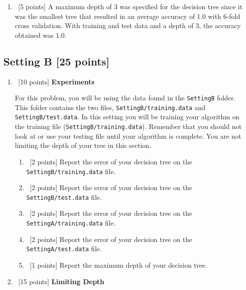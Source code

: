 \begin{enumerate}
\begin{enumerate}
  \item ~[5 points]  A maximum depth of 3 was specified for the decision tree since it was the smallest tree that resulted in an average accuracy of 1.0 with 6-fold cross validation. With training and test data and a depth of 3, the accuracy obtained was 1.0.
  \end{enumerate}

\end{enumerate}

\subsection*{Setting B [25 points]}

\begin{enumerate}
\item ~[10 points] \textbf{Experiments}
  
  For this problem, you will be using the data found in the \texttt{SettingB} folder. This folder contains the two files, \texttt{SettingB/training.data} and \texttt{SettingB/test.data}. In this setting you will be training your algorithm on the training file (\texttt{SettingB/training.data}). Remember that you should not look at or use your testing file until your algorithm is complete. You are not limiting the depth of your tree in this section. 
  
  \begin{enumerate}
    
  \item ~[2 points]  Report the error of your decision tree on the \texttt{SettingB/training.data} file. 
    
  \item ~[2 points] Report the error of your decision tree on the \texttt{SettingB/test.data} file. 
    
  \item ~[2 points] Report the error of your decision tree on the \texttt{SettingA/training.data} file. 
    
  \item ~[2 points] Report the error of your decision tree on the \texttt{SettingA/test.data} file. 
    
  \item ~[1 points] Report the maximum depth of your decision tree. 
  \end{enumerate}
  
\item ~[15 points] \textbf{Limiting Depth}
  

\end{enumerate}
